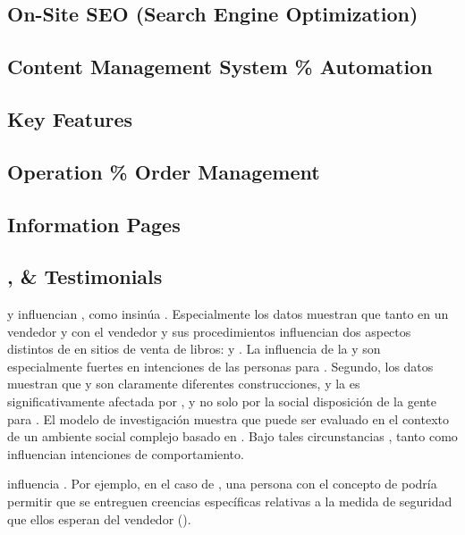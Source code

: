 \subsection{On-Site SEO (Search Engine Optimization)}
\subsection{Content Management System \% Automation}
\subsection{Key \ecommerce Features}
\subsection{Operation \% Order Management}
\subsection{Information Pages}
\subsection{\security, \trust \& Testimonials}

\trust y \familiarity influencian \ecommerce, como insinúa \luhmanntheory. Especialmente los datos muestran que tanto \trust en un vendedor \internet y \familiarity con el vendedor y sus procedimientos influencian dos aspectos distintos de \ecommerce en sitios de venta de libros: \inquiry y \purchase. La influencia de la  \familiarity y \trust son especialmente fuertes en intenciones  de las personas para \purchase. Segundo, los datos muestran que \trust y \familiarity son claramente diferentes construcciones, y la \trust es significativamente afectada por \familiarity, y no solo por la social disposición de la gente para \trust. El modelo de investigación muestra que  \ecommerce puede ser evaluado en el contexto de un ambiente social complejo basado en \luhmanntheory. Bajo tales circunstancias , tanto \trust como \familiarity influencian intenciones de comportamiento\cite{gefen2000commerce}.

\security influencia \trust. Por ejemplo, en el caso de \amazon, una persona \familiarity con el concepto de \secureintcom podría permitir que se entreguen creencias específicas relativas a la medida de seguridad que ellos esperan del vendedor (\trust)\cite{gefen2000commerce}.

